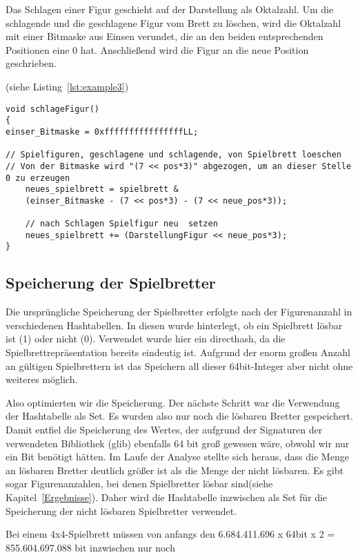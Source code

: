 \documentclass[
	12pt,
	a4paper,
	BCOR10mm,
	DIV14,
	listof=totoc,
	bibliography=totoc,
	headsepline
]{scrreprt}
\begin{document}
Das Schlagen einer Figur geschieht auf der Darstellung als Oktalzahl.
Um die schlagende und die geschlagene Figur vom Brett zu löschen, wird die Oktalzahl mit einer Bitmaske aus Einsen verundet, die an den beiden entsprechenden Positionen eine 0 hat.
Anschließend wird die Figur an die neue Position geschrieben. 


(siehe Listing~\ref{lst:example3})
\begin{lstlisting}[caption={Schlagen einer Figur}, label={lst:example3}]
void schlageFigur()
{
einser_Bitmaske = 0xffffffffffffffffLL;

// Spielfiguren, geschlagene und schlagende, von Spielbrett loeschen 
// Von der Bitmaske wird "(7 << pos*3)" abgezogen, um an dieser Stelle 0 zu erzeugen 
	neues_spielbrett = spielbrett & 
	(einser_Bitmaske - (7 << pos*3) - (7 << neue_pos*3));
	
	// nach Schlagen Spielfigur neu  setzen 
	neues_spielbrett += (DarstellungFigur << neue_pos*3);
}

\end{lstlisting}



\subsection{Speicherung der Spielbretter}

Die ursprüngliche Speicherung der Spielbretter erfolgte nach der Figurenanzahl in verschiedenen Hashtabellen.
In diesen wurde hinterlegt, ob ein Spielbrett lösbar ist (1) oder nicht (0). Verwendet wurde hier ein directhash, da die Spielbrettrepräsentation bereits eindeutig ist.
Aufgrund der enorm großen Anzahl an gültigen Spielbrettern ist das Speichern all dieser 64bit-Integer aber nicht ohne weiteres möglich.

Also optimierten wir die Speicherung. Der nächste Schritt war die Verwendung der Hashtabelle als Set.
Es wurden also nur noch die lösbaren Bretter gespeichert. Damit entfiel die Speicherung des Wertes, der aufgrund der Signaturen der verwendeten Bibliothek (glib) ebenfalls 64 bit groß gewesen wäre, obwohl wir nur ein Bit benötigt hätten.
Im Laufe der Analyse stellte sich heraus, dass die Menge an lösbaren Bretter deutlich größer ist als die Menge der nicht lösbaren. Es gibt sogar Figurenanzahlen, bei denen Spielbretter lösbar sind(siehe Kapitel~\ref{Ergebnisse}).
Daher wird die Hashtabelle inzwischen als Set für die Speicherung der nicht lösbaren Spielbretter verwendet.

Bei einem 4x4-Spielbrett müssen von anfangs den 6.684.411.696 x 64bit x 2 = 855.604.697.088 bit inzwischen nur noch \\
\end{document}
